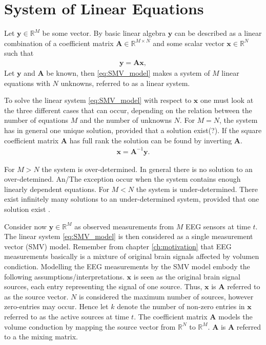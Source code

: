 \section{System of Linear Equations}\label{sec:SMV}
Let $\mathbf{y} \in \mathbb{R}^M$ be some vector. By basic linear algebra $\mathbf{y}$ can be described as a linear combination of a coefficient matrix $\mathbf{A} \in \mathbb{R}^{M \times N}$ and some scalar vector $\mathbf{x} \in \mathbb{R}^N$ such that
\begin{align}\label{eq:SMV_model}
\mathbf{y} = \mathbf{Ax},
\end{align}
Let $\mathbf{y}$ and $\mathbf{A}$ be known, then  
\ref{eq:SMV_model} makes a system of $M$ linear equations with $N$ unknowns, referred to as a linear system. 

To solve the linear system \ref{eq:SMV_model} with respect to $\textbf{x}$ one must look at the three different cases that can occur, depending on the relation between the number of equations $M$ and the number of unknowns $N$.
For $M = N$, the system has in general one unique solution, provided that a solution exist(?).  
If the square coefficient matrix $\mathbf{A}$ has full rank the solution can be found by inverting $\mathbf{A}$.
\begin{align*}
\mathbf{x} = \mathbf{A}^{-1} \mathbf{y}.
\end{align*}

For $M > N$ the system is over-determined. In general there is no solution to an over-detemined. An/The exception occur when the system contains enough linearly dependent equations.    
For $M < N$ the system is under-determined. There exist infinitely many solutions to an under-determined system, provided that one solution exist \cite[p. ix]{CS}.  

Consider now $\mathbf{y} \in \mathbb{R}^M$ as observed measurements from $M$ EEG sensors at time $t$. 
The linear system \ref{eq:SMV_model} is then considered as a single measurement vector (SMV) model.
Remember from chapter \ref{ch:motivation} that EEG measurements basically is a mixture of original brain signals affected by volumen condiction.  
Modelling the EEG measurements by the SMV model embody the following assumptions/interpretations. $\textbf{x}$ is seen as the original brain signal sources, each entry representing the signal of one source. 
Thus, $\textbf{x}$ is $\textbf{A}$ referred to as the source vector. $N$ is considered the maximum number of sources, however zero-entries may occur. Hence let $k$ denote the number of non-zero entries in $\textbf{x}$ referred to as the active sources at time $t$.   
The coefficient matrix $\textbf{A}$ models the volume conduction by mapping the source vector from $\mathbb{R}^N$ to $\mathbb{R}^M$. $\textbf{A}$ is $\textbf{A}$ referred to a the mixing matrix.             

